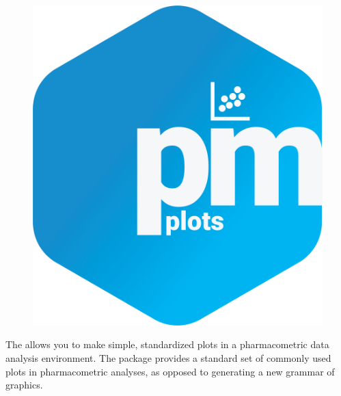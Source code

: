 \documentclass[portrait,fontscale=0.46,paperwidth=36in,paperheight=48in]{baposter}
\begin{document}
\begin{poster}
{\begin{minipage}[c]{0.333\linewidth}
\begin{demobx}[]
		\begin{figure}
			\vspace{-0.45cm}
			\includegraphics[scale=0.15]{"images/metrum_pmplots_git_logo.png"} 
		\end{figure}
		The  allows you to make simple, standardized plots in a pharmacometric data analysis environment. The package provides a standard set of commonly used plots in pharmacometric analyses, as opposed to generating a new grammar of graphics.


		

\end{demobx}
\end{minipage}}
\end{poster}
\end{document}
